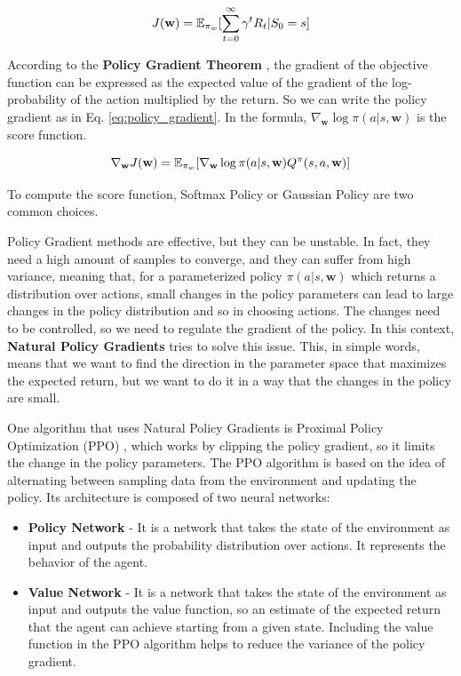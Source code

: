 \begin{equation} \label{eq:obj_function}
    J(\textbf{w}) = \operatorname{\mathbb{E}}_{\pi_w}[\sum_{t=0}^{\infty} \gamma^t R_t | S_0 = s]
\end{equation}

According to the \textbf{Policy Gradient Theorem} \citep{sutton1999policy}, the gradient of the objective function can be expressed as the expected value of the gradient of the log-probability of the action multiplied by the return.
So we can write the policy gradient as in Eq. \ref{eq:policy_gradient}.
In the formula, $\nabla_{\textbf{w}} \log \pi(a|s, \textbf{w})$ is the score function.

\begin{equation} \label{eq:policy_gradient}
    \nabla_{\textbf{w}} J(\textbf{w}) = \operatorname{\mathbb{E}}_{\pi_w}[\nabla_{\textbf{w}} \log \pi(a|s, \textbf{w}) Q^{\pi}(s, a, \textbf{w})]
\end{equation}


To compute the score function, Softmax Policy or Gaussian Policy are two common choices.

Policy Gradient methods are effective, but they can be unstable.
In fact, they need a high amount of samples to converge, and they can suffer from high variance, meaning that, for a parameterized policy $\pi(a|s, \textbf{w})$ which returns a distribution over actions, small changes in the policy parameters can lead to large changes in the policy distribution and so in choosing actions.
The changes need to be controlled, so we need to regulate the gradient of the policy.
In this context, \textbf{Natural Policy Gradients} \citep{kakade2001natural} tries to solve this issue.
This, in simple words, means that we want to find the direction in the parameter space that maximizes the expected return, but we want to do it in a way that the changes in the policy are small.


One algorithm that uses Natural Policy Gradients is Proximal Policy Optimization (PPO) \citep{schulman2017proximal}, which works by clipping the policy gradient, so it limits the change in the policy parameters.
The PPO algorithm is based on the idea of alternating between sampling data from the environment and updating the policy.
Its architecture is composed of two neural networks:

\begin{itemize}
    \item \textbf{Policy Network} - It is a network that takes the state of the environment as input and outputs the probability distribution over actions.
    It represents the behavior of the agent.
    \item \textbf{Value Network} - It is a network that takes the state of the environment as input and outputs the value function, so an estimate of the expected return that the agent can achieve starting from a given state.
    Including the value function in the PPO algorithm helps to reduce the variance of the policy gradient.
\end{itemize}

